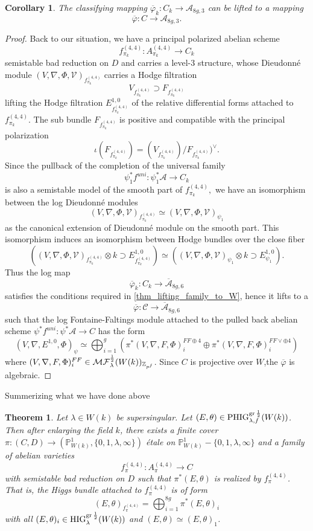 \documentclass[12pt,twoside]{book}
\theoremstyle{plain}
\newtheorem{theorem}{Theorem}[section]
\newtheorem{corollary}[corollary]{Corollary}
\theoremstyle{definition}
\theoremstyle{remark}
\newcommand{\mA}{{\mathcal A}}
\newcommand{\mC}{{\mathcal C}}
\newcommand{\MF}{\mathcal{MF}}
\numberwithin{equation}{section}
\def\High{{\mathrm{HIG}^{{\rm gr}\,{1\over 2}}_{\lambda}}}
\def\MFh{\MF^{{1\over 2}}_{\lambda}}
\def\PHighf{{\mathrm{PHIG}^{{\rm gr}\,{1\over 2}}_{\lambda,f}}}
\begin{document}
\begin{corollary}
The classifying mapping $\overline{\varphi}_k\colon C_k \rightarrow \mA_{8g,3}$ can be lifted to a mapping
\[\overline{\varphi}\colon C \rightarrow \mA_{8g,3}.\]
\end{corollary}
\begin{proof}
Back to our situation, we have a principal polarized abelian scheme
\[f^{(4,4)}_{\pi_k}: A^{(4,4)}_{\pi_k} \to C_k\] semistable bad reduction on $D$ and carries a level-3 structure, whose Dieudonn\'e module $(V,\nabla,\Phi,\mathcal V)_{f^{(4,4)}_{\pi_k}}$
carries a Hodge filtration
\[V_{f^{(4,4)}_{\pi_k}} \supset F_{f^{(4,4)}_{\pi_k}}\]
lifting the Hodge filtration $E^{1,0}_{f^{(4,4)}_{\pi_k}}$ of the relative differential forms attached to $f_{\pi_k}^{(4,4)}$. The sub bundle
$F_{f^{(4,4)}_{\pi_k}}$ is positive and compatible with the principal polarization
\[\iota(F_{f^{(4,4)}_{\pi_k}}) = (V_{f^{(4,4)}_{\pi_k}})/ F_{f^{(4,4)}_{\pi_k}})^\vee.\]
Since the pullback of the completion of the universal family $$\psi_1^*f^{uni}: \psi_1^*\mathcal A\to C_k$$
is also a semistable model of the smooth part of $f^{(4,4)}_{\pi_k},$ we have an isomorphism between the log Dieudonn\'e modules
$$(V,\nabla,\Phi,\mathcal V)_{f^{(4,4)}_{\pi_k}}\simeq (V,\nabla,\Phi,\mathcal V)_{\psi_1}$$
as the canonical extension of Dieudonn\'e module on the smooth part. This isomorphism
induces an isomorphism between Hodge bundles over the close fiber
$$( (V,\nabla,\Phi,\mathcal V)_{f^{(4,4)}_{\pi_k}}\otimes k \supset E^{1,0}_{f^{(4,4)}_{\pi_k}})\simeq ( (V,\nabla,\Phi,\mathcal V)_{\psi_1}\otimes k\supset E^{1,0}_{\psi_1}).$$
Thus the log map
\[\overline{\varphi}_k: C_k\to \overline{\mA}_{8g,6}\]
satisfies the conditions required in \autoref{thm_lifting_family_to_W}, hence it lifts to a
\[\overline{\varphi}: \mC \to \overline{\mA}_{8g,6}\]
such that the log Fontaine-Faltings module
attached to the pulled back abelian scheme $\psi^*f^{uni}: \psi^* \mathcal A\to C$ has the form
\[ (V,\nabla,E^{1,0},\Phi)_\psi\simeq \bigoplus_{i=1}^{g}(\pi^*(V,\nabla,F,\Phi)^{FF \oplus 4}_{i}\oplus
\pi^*(V,\nabla,F,\Phi)^{FF \vee \oplus 4}_{i})\]
where $(V,\nabla,F,\Phi)^{FF}_{i}\in \MFh(W(k))_{\mathbb Z_{p^f}}$. Since $C$ is projective over $W$,the $\overline{\varphi}$ is algebraic.
\end{proof}

Summerizing what we have done above
\begin{theorem}
Let $\lambda\in W(k)$ be supersingular. Let $(E,\theta)\in \PHighf(W(k))$. Then after enlarging the field $k$, there exists a finite cover $\pi: (C,D)\to(\mathbb P^1_{W(k)},\{0,1,\lambda,\infty\})$ \'etale on $\mathbb P^1_{W(k)}-\{0,1,\lambda,\infty\}$ and a family of abelian varieties
\[f^{(4,4)}_{\pi}: A^{(4,4)}_{\pi}\to C\]
with semistable bad reduction on $D$ such that $\pi^*(E,\theta)$ is realized by $f^{(4,4)}_{\pi}$. That is, the Higgs bundle attached to $f^{(4,4)}_{\pi}$ is of form
\[(E,\theta)_{f^{(4,4)}_{\pi}} =\bigoplus_{i=1}^{8g}\pi^*(E,\theta)_i\]
with all $(E,\theta)_i\in\High(W(k))$
and $(E,\theta)\simeq (E,\theta)_1$.
\end{theorem}
\end{document}
